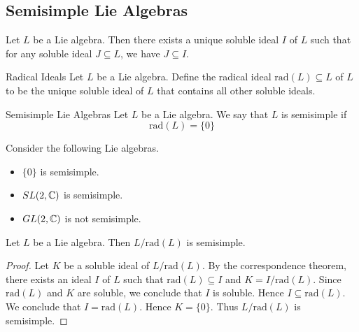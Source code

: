\documentclass[a4paper]{article}
\begin{document}
\subsection{Semisimple Lie Algebras}
\begin{prp}{}{} Let $L$ be a Lie algebra. Then there exists a unique soluble ideal $I$ of $L$ such that for any soluble ideal $J\subseteq L$, we have $J\subseteq I$. 
\end{prp}

\begin{defn}{Radical Ideals}{} Let $L$ be a Lie algebra. Define the radical ideal $\text{rad}(L)\subseteq L$ of $L$ to be the unique soluble ideal of $L$ that contains all other soluble ideals. 
\end{defn}

\begin{defn}{Semisimple Lie Algebras}{}{} Let $L$ be a Lie algebra. We say that $L$ is semisimple if $$\text{rad}(L)=\{0\}$$
\end{defn}

\begin{eg}{}{} Consider the following Lie algebras. 
\begin{itemize}
\item $\{0\}$ is semisimple. 
\item $SL(2,\mathbb{C})$ is semisimple. 
\item $GL(2,\mathbb{C})$ is not semisimple. 
\end{itemize}
\end{eg}

\begin{lmm}{}{} Let $L$ be a Lie algebra. Then $L/\text{rad}(L)$ is semisimple. \tcbline
\begin{proof}
Let $K$ be a soluble ideal of $L/\text{rad}(L)$. By the correspondence theorem, there exists an ideal $I$ of $L$ such that $\text{rad}(L)\subseteq I$ and $K=I/\text{rad}(L)$. Since $\text{rad}(L)$ and $K$ are soluble, we conclude that $I$ is soluble. Hence $I\subseteq\text{rad}(L)$. We conclude that $I=\text{rad}(L)$. Hence $K=\{0\}$. Thus $L/\text{rad}(L)$ is semisimple. 
\end{proof}
\end{lmm}
\end{document}
